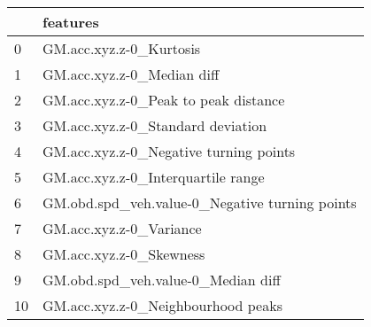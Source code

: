 \begin{tabular}{ll}
\toprule
{} &                                        features \\
\midrule
0  &                         GM.acc.xyz.z-0\_Kurtosis \\
1  &                      GM.acc.xyz.z-0\_Median diff \\
2  &            GM.acc.xyz.z-0\_Peak to peak distance \\
3  &               GM.acc.xyz.z-0\_Standard deviation \\
4  &          GM.acc.xyz.z-0\_Negative turning points \\
5  &              GM.acc.xyz.z-0\_Interquartile range \\
6  &  GM.obd.spd\_veh.value-0\_Negative turning points \\
7  &                         GM.acc.xyz.z-0\_Variance \\
8  &                         GM.acc.xyz.z-0\_Skewness \\
9  &              GM.obd.spd\_veh.value-0\_Median diff \\
10 &              GM.acc.xyz.z-0\_Neighbourhood peaks \\
\bottomrule
\end{tabular}
